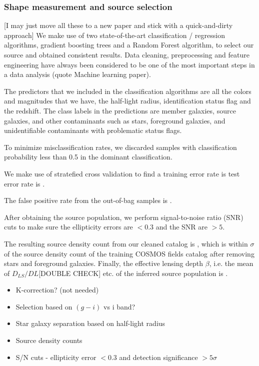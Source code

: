 \documentclass[letterpaper,useAMS,usenatbib]{mn2e}
\begin{document}
\subsubsection{Shape measurement and source selection}
[I may just move all these to a new paper and stick with a quick-and-dirty
approach]
We make use of two state-of-the-art classification / regression algorithms,
gradient boosting trees and a Random Forest algorithm,
to select our source and obtained consistent results. 
Data cleaning, preprocessing and feature engineering have always been considered to
be one of the most important steps in a data analysis (quote Machine learning
paper). 

The predictors that we included in the classification algorithms are all the
colors and magnitudes that we have, the half-light radius, identification
status flag and the redshift. 
The class labels in the predictions are 
member galaxies, source galaxies, and other contaminants such as stars,
foreground galaxies, and unidentifiable contaminants with problematic status
flags.

To minimize misclassification rates, we discarded samples with classification
probability less than 0.5 in the dominant classification. 

We make use of stratefied cross validation to find a  
training error rate is 
test error rate is .

The false positive rate from the out-of-bag samples is .

After obtaining the source population, 
we perform signal-to-noise ratio (SNR) cuts to make sure the ellipticity errors are $< 0.3$ 
and the SNR are $>5$.

The resulting source density count from our cleaned catalog is , which is
within $\sigma$ of the source density count of the training COSMOS fields
catalog after removing stars and foreground galaxies.  
Finally, the effective lensing depth $\beta$, i.e. the mean of $D_{LS} / D{L}$[DOUBLE
CHECK] etc. of the inferred source population is .  


\begin{itemize}
	\item K-correction? (not needed)
	\item Selection based on $(g-i)$ vs i band? 
	\item Star galaxy separation based on half-light radius 
	\item Source density counts   
	\item S/N cuts - ellipticity error $< 0.3$ and detection significance $> 5\sigma$
\end{itemize}
\end{document}
